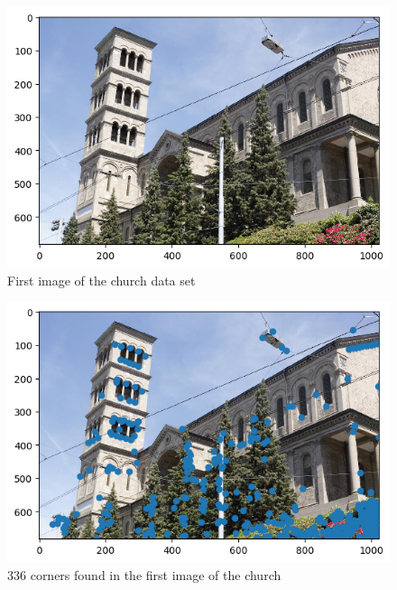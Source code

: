 \begin{figure}[h!]
\centering
\includegraphics[width=1 \textwidth]{./Diagrams/first_frame_church.png}
\caption{First image of the church data set}
\label{fig:first_frame_church}
\end{figure}

\begin{figure}[h!]
\centering
\includegraphics[width=1\textwidth]{./Diagrams/first_frame_church_points.png}
\caption{336 corners found in the first image of the church}
\label{fig:first_frame_church_points}
\end{figure}

